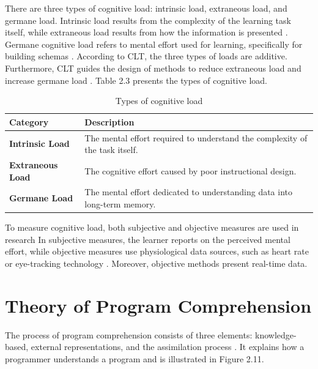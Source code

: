There are three types of cognitive load: intrinsic load, extraneous load, and germane load. Intrinsic load results from the complexity of the learning task itself, while extraneous load results from how the information is presented \cite{schnotz2007reconsideration}. Germane cognitive load refers to mental effort used for learning, specifically for building schemas \cite{chen2009cognitive}. According to CLT, the three types of loads are additive. Furthermore, CLT guides the design of methods to reduce extraneous load and increase germane load  \cite{chen2009cognitive}. Table 2.3 presents the types of cognitive load.



\begin{table}[ht]
\centering
\small %
\caption{Types of cognitive load}
\begin{tabular}{p{} | p{}}
\hline
\rule{0pt}{1.2em}\textbf{Category} & \textbf{Description} \\[0.5em]
\hline
\rule{0pt}{1.2em}\textbf{Intrinsic Load} & The mental effort required to understand the complexity of the task itself. \\[0.5em]
\hline
\rule{0pt}{1.2em}\textbf{Extraneous Load} & The cognitive effort caused by poor instructional design. \\[0.5em]
\hline
\rule{0pt}{1.2em}\textbf{Germane Load} & The mental effort dedicated to understanding data into long-term memory. \\[0.5em]
\hline
\end{tabular}
\label{tab:cognitive_load}
\end{table}



To measure cognitive load, both subjective and objective measures are used in research
In subjective measures, the  learner reports on the perceived mental effort, while objective measures use physiological data sources, such as heart rate or eye-tracking technology \cite{duran2022cognitive}. Moreover, objective methods present real-time data.


\section{Theory of Program Comprehension}

The process of program comprehension consists of three elements: knowledge-based, external representations, and the assimilation process \cite{kadar2021program}. It explains how a programmer understands a program and is illustrated in Figure 2.11.


